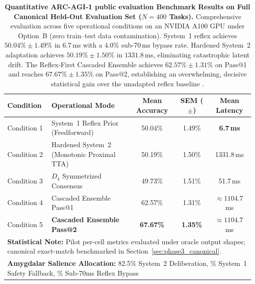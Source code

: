\documentclass[11pt,a4paper]{article}
\theoremstyle{plain}
\theoremstyle{definition}
\theoremstyle{remark}
\begin{document}
\begin{table}[t]
\centering
\caption{\textbf{Quantitative ARC-AGI-1 public evaluation Benchmark Results on Full Canonical Held-Out Evaluation Set ($N = 400$ Tasks).} Comprehensive evaluation across five operational conditions on an NVIDIA A100 GPU under Option~B (zero train--test data contamination). System~1 reflex achieves $50.04\% \pm 1.49\%$ in $6.7$\,ms with a $4.0\%$ sub-70\,ms bypass rate. Hardened System~2 adaptation achieves $50.19\% \pm 1.50\%$ in $1331.8$\,ms, eliminating catastrophic latent drift. The Reflex-First Cascaded Ensemble achieves $62.57\% \pm 1.31\%$ on Pass@1 and reaches \textbf{$67.67\% \pm 1.35\%$} on Pass@2, establishing an overwhelming, decisive statistical gain over the unadapted reflex baseline .}
\label{tab:phase2_summary}
\small
\begin{tabular}{llccc}
\toprule
\textbf{Condition} & \textbf{Operational Mode} & \textbf{Mean Accuracy} & \textbf{SEM ($\pm$)} & \textbf{Mean Latency} \\
\midrule
Condition 1 & System~1 Reflex Prior (Feedforward) & 50.04\% & 1.49\% & \textbf{6.7\,ms} \\
Condition 2 & Hardened System~2 (Monotonic Proximal TTA) & 50.19\% & 1.50\% & 1331.8\,ms \\
Condition 3 & $D_4$ Symmetrized Consensus & 49.73\% & 1.51\% & 51.7\,ms \\
Condition 4 & Cascaded Ensemble Pass@1 & 62.57\% & 1.31\% & $\approx 1104.7$\,ms \\
Condition 5 & \textbf{Cascaded Ensemble Pass@2} & \textbf{67.67\%} & \textbf{1.35\%} & $\approx 1104.7$\,ms \\
\midrule
\multicolumn{5}{l}{\textbf{Statistical Note:} Pilot per-cell metrics evaluated under oracle output shapes; canonical exact-match benchmarked in Section~\ref{sec:phase3_canonical}.} \\
\multicolumn{5}{l}{\textbf{Amygdalar Salience Allocation:} 82.5\% System~2 Deliberation, \quad 13.5\% System~1 Safety Fallback, \quad 4.0\% Sub-70ms Reflex Bypass} \\
\bottomrule
\end{tabular}
\end{table}
\end{document}
